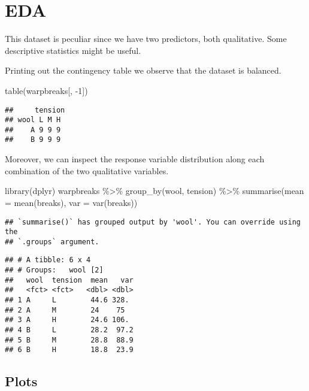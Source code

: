 \documentclass[
  oneside]{book}
\newenvironment{Shaded}{\begin{snugshade}}{\end{snugshade}}
\newcommand{\AttributeTok}[1]{\textcolor[rgb]{0.77,0.63,0.00}{#1}}
\newcommand{\DecValTok}[1]{\textcolor[rgb]{0.00,0.00,0.81}{#1}}
\newcommand{\FunctionTok}[1]{\textcolor[rgb]{0.00,0.00,0.00}{#1}}
\newcommand{\NormalTok}[1]{#1}
\newcommand{\SpecialCharTok}[1]{\textcolor[rgb]{0.00,0.00,0.00}{#1}}
\begin{document}
\hypertarget{eda-1}{%
\section{EDA}\label{eda-1}}

This dataset is peculiar since we have two predictors, both qualitative.
Some descriptive statistics might be useful.

Printing out the contingency table we observe that the dataset
is balanced.

\begin{Shaded}
\begin{Highlighting}[]
\FunctionTok{table}\NormalTok{(warpbreaks[, }\SpecialCharTok{{-}}\DecValTok{1}\NormalTok{])}
\end{Highlighting}
\end{Shaded}

\begin{verbatim}
##     tension
## wool L M H
##    A 9 9 9
##    B 9 9 9
\end{verbatim}

Moreover, we can inspect the response variable distribution
along each combination of the two qualitative variables.

\begin{Shaded}
\begin{Highlighting}[]
\FunctionTok{library}\NormalTok{(dplyr)}
\NormalTok{warpbreaks }\SpecialCharTok{\%\textgreater{}\%}
  \FunctionTok{group\_by}\NormalTok{(wool, tension) }\SpecialCharTok{\%\textgreater{}\%}
  \FunctionTok{summarise}\NormalTok{(}\AttributeTok{mean =} \FunctionTok{mean}\NormalTok{(breaks), }\AttributeTok{var =} \FunctionTok{var}\NormalTok{(breaks))}
\end{Highlighting}
\end{Shaded}

\begin{verbatim}
## `summarise()` has grouped output by 'wool'. You can override using the
## `.groups` argument.
\end{verbatim}

\begin{verbatim}
## # A tibble: 6 x 4
## # Groups:   wool [2]
##   wool  tension  mean   var
##   <fct> <fct>   <dbl> <dbl>
## 1 A     L        44.6 328. 
## 2 A     M        24    75  
## 3 A     H        24.6 106. 
## 4 B     L        28.2  97.2
## 5 B     M        28.8  88.9
## 6 B     H        18.8  23.9
\end{verbatim}

\hypertarget{plots-1}{%
\subsection{Plots}\label{plots-1}}
\end{document}
